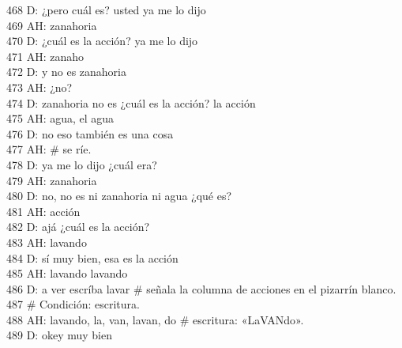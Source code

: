 468 D: ¿pero cuál es? usted ya me lo dijo\\
469 AH: zanahoria\\
470 D: ¿cuál es la acción? ya me lo dijo\\
471 AH: zanaho\\
472 D: y no es zanahoria\\
473 AH: ¿no?\\
474 D: zanahoria no es ¿cuál es la acción? la acción\\
475 AH: agua, el agua\\
476 D: no eso también es una cosa\\
477 AH: \# se ríe.\\
478 D: ya me lo dijo ¿cuál era?\\
479 AH: zanahoria\\
480 D: no, no es ni zanahoria ni agua ¿qué es?\\
481 AH: acción\\
482 D: ajá ¿cuál es la acción? \\
483 AH: lavando\\
484 D: sí muy bien, esa es la acción\\
485 AH: lavando lavando\\
486 D: a ver escríba lavar \# señala la columna de acciones en el pizarrín blanco.\\
487 \# Condición: escritura.\\
488 AH: lavando, la, van, lavan, do \# escritura: «LaVANdo».\\
489 D: okey muy bien\\
